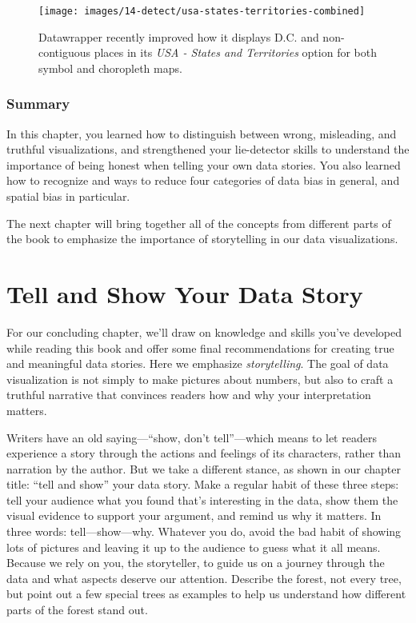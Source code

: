\documentclass[
  english,
]{book}
\begin{document}
\begin{figure}
\texttt{[image: images/14-detect/usa-states-territories-combined]} \caption{Datawrapper recently improved how it displays D.C. and non-contiguous places in its \emph{USA - States and Territories} option for both symbol and choropleth maps.}\label{fig:usa-states-territories}
\end{figure}

\hypertarget{summary14}{%
\subsection*{Summary}\label{summary14}}

In this chapter, you learned how to distinguish between wrong, misleading, and truthful visualizations, and strengthened your lie-detector skills to understand the importance of being honest when telling your own data stories. You also learned how to recognize and ways to reduce four categories of data bias in general, and spatial bias in particular.

The next chapter will bring together all of the concepts from different parts of the book to emphasize the importance of storytelling in our data visualizations.

\hypertarget{story}{%
\chapter{Tell and Show Your Data Story}\label{story}}

For our concluding chapter, we'll draw on knowledge and skills you've developed while reading this book and offer some final recommendations for creating true and meaningful data stories. Here we emphasize \emph{storytelling}. The goal of data visualization is not simply to make pictures about numbers, but also to craft a truthful narrative that convinces readers how and why your interpretation matters.

Writers have an old saying---``show, don't tell''---which means to let readers experience a story through the actions and feelings of its characters, rather than narration by the author. But we take a different stance, as shown in our chapter title: ``tell and show'' your data story. Make a regular habit of these three steps: tell your audience what you found that's interesting in the data, show them the visual evidence to support your argument, and remind us why it matters. In three words: tell---show---why. Whatever you do, avoid the bad habit of showing lots of pictures and leaving it up to the audience to guess what it all means. Because we rely on you, the storyteller, to guide us on a journey through the data and what aspects deserve our attention. Describe the forest, not every tree, but point out a few special trees as examples to help us understand how different parts of the forest stand out.
\end{document}

